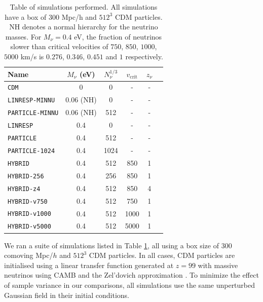 \documentclass[useAMS, usenatbib]{mnras}
\begin{document}
\begin{table}
\begin{center}
\begin{tabular}{|l|c|c|c|c|l|}
\hline
Name & $M_\nu$ (eV) &  $N_\nu^{1/3}$ & $v_\mathrm{crit}$ & $z_\nu$ \\
\hline
\texttt{CDM}    &       0             &             0         & - & -    \\
\texttt{LINRESP-MINNU}    &     0.06 (NH)      & 0         & - &  -  \\
\texttt{PARTICLE-MINNU}    &     0.06 (NH)      & 512      & - &  -  \\
\texttt{LINRESP}   &     0.4            & 0         & - &   - \\
\texttt{PARTICLE}    &     0.4             &   512       & - &   - \\
\texttt{PARTICLE-1024}    &     0.4             &    1024 & - & -    \\
\texttt{HYBRID}    &     0.4             &    512      & 850 & 1\\
\texttt{HYBRID-256}    &     0.4             &    256       & 850 &1 \\
\texttt{HYBRID-z4}    &     0.4             &    512       & 850 & 4  \\
\texttt{HYBRID-v750}  &     0.4             &    512       & 750 & 1\\
\texttt{HYBRID-v1000}   &     0.4             &    512       & 1000 & 1\\
\texttt{HYBRID-v5000}   &     0.4             &   512       & 5000 & 1 \\
\hline
\end{tabular}
\end{center}
\caption{Table of simulations performed. All simulations have a box of $300$ Mpc/h
and $512^3$ CDM particles. NH denotes a normal hierarchy for the neutrino masses.
For $M_\nu = 0.4$ eV, the fraction of neutrinos slower than critical velocities of $750$, $850$, $1000$, $5000$ km/s is $0.276$, $0.346$, $0.451$ and $1$ respectively.}
\label{tab:simulations}
\end{table}

We ran a suite of simulations listed in Table \ref{tab:simulations}, all using a box size of $300$ comoving Mpc/$h$ and $512^3$ CDM particles. In all cases, CDM particles are initialised using a linear transfer function generated at $z=99$ with massive neutrinos using CAMB \citep{CAMB_neutrinos} and the Zel'dovich approximation \citep{Zeldovich_1970}. To minimize the effect of sample variance in our comparisons, all simulations use the same unperturbed Gaussian field in their initial conditions.
\end{document}
